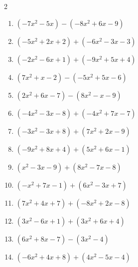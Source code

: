\begin{multicols}{2}
\begin{enumerate}

  \item $(-7x^{2}-5x)-(-8x^{2}+6x-9)$


  \item $(-5x^{2}+2x+2)+(-6x^{2}-3x-3)$


  \item $(-2x^{2}-6x+1)+(-9x^{2}+5x+4)$


  \item $(7x^{2}+x-2)-(-5x^{2}+5x-6)$


  \item $(2x^{2}+6x-7)-(8x^{2}-x-9)$


  \item $(-4x^{2}-3x-8)+(-4x^{2}+7x-7)$


  \item $(-3x^{2}-3x+8)+(7x^{2}+2x-9)$


  \item $(-9x^{2}+8x+4)+(5x^{2}+6x-1)$


  \item $(x^{2}-3x-9)+(8x^{2}-7x-8)$


  \item $(-x^{2}+7x-1)+(6x^{2}-3x+7)$


  \item $(7x^{2}+4x+7)+(-8x^{2}+2x-8)$


  \item $(3x^{2}-6x+1)+(3x^{2}+6x+4)$


  \item $(6x^{2}+8x-7)-(3x^{2}-4)$


  \item $(-6x^{2}+4x+8)+(4x^{2}-5x-4)$


\end{enumerate}
\end{multicols}
